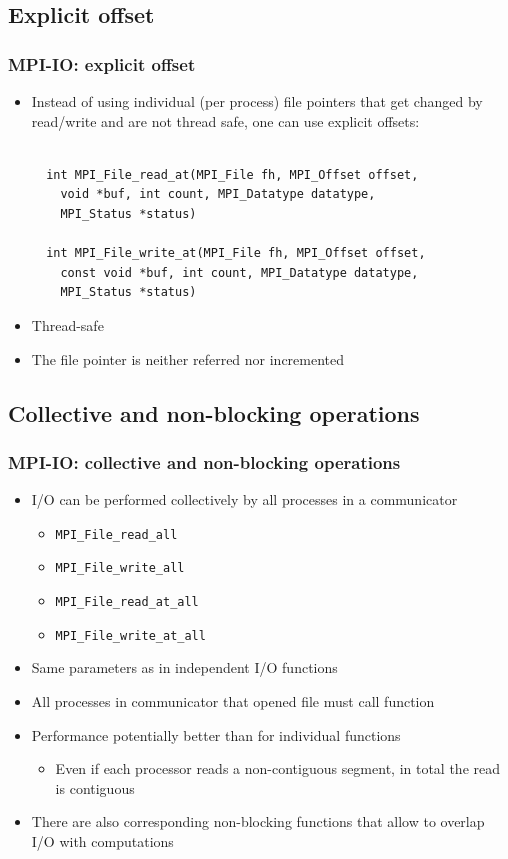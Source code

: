 \documentclass{beamer}
\begin{document}
\subsection{Explicit offset}
\begin{frame}[fragile]
  \frametitle{MPI-IO: explicit offset}
\begin{itemize}
\item Instead of using individual (per process) file pointers that get changed by read/write and are not thread safe, one can use explicit offsets:
{\color{mycolorcode}
\begin{verbatim}

  int MPI_File_read_at(MPI_File fh, MPI_Offset offset, 
    void *buf, int count, MPI_Datatype datatype, 
    MPI_Status *status)

  int MPI_File_write_at(MPI_File fh, MPI_Offset offset, 
    const void *buf, int count, MPI_Datatype datatype, 
    MPI_Status *status)

\end{verbatim}
}
\item Thread-safe
\item The file pointer is neither referred nor incremented
\end{itemize}
\end{frame}

\subsection{Collective and non-blocking operations}
\begin{frame}[fragile]
  \frametitle{MPI-IO: collective and non-blocking operations}
\begin{itemize}
\item I/O can be performed collectively by all processes in a
communicator
\begin{itemize}
\item {\color{mycolorcode}\verb|MPI_File_read_all|}
\item {\color{mycolorcode}\verb|MPI_File_write_all|}
\item {\color{mycolorcode}\verb|MPI_File_read_at_all|}
\item {\color{mycolorcode}\verb|MPI_File_write_at_all|}
\end{itemize}
\item Same parameters as in independent I/O functions
\item All processes in communicator that opened file must call
function
\item Performance potentially better than for individual
functions
\begin{itemize}
\item Even if each processor reads a non-contiguous segment, in
total the read is contiguous
\end{itemize}
\item There are also corresponding non-blocking functions that allow to overlap I/O with computations
\end{itemize}
\end{frame}
\end{document}

